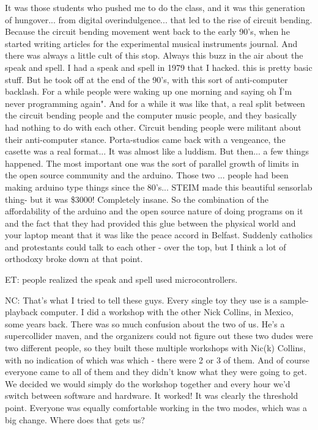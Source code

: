 It was those students who pushed me to do the class, and it was this generation of hungover... from digital overindulgence... that led to the rise of circuit bending. Because the circuit bending movement went back to the early 90's, when he started writing articles for the experimental musical instruments journal. And there was always a little cult of this stop. Always this buzz in the air about the speak and spell. I had a speak and spell in 1979 that I hacked. this is pretty basic stuff. But he took off at the end of the 90's, with this sort of anti-computer backlash. For a while people were waking up one morning and saying oh \"I'm never programming again". And for a while it was like that, a real split between the circuit bending people and the computer music people, and they basically had nothing to do with each other. Circuit bending people were militant about their anti-computer stance. Porta-studios came back with a vengeance, the casette was a real format... It was almost like a luddism. But then... a few things happened. The most important one was the sort of parallel growth of limits in the open source community and the arduino. Those two ... people had been making arduino type things since the 80's... STEIM made this beautiful sensorlab thing- but it was \$3000! Completely insane. So the combination of the affordability of the arduino and the open source nature of doing programs on it and the fact that they had provided this glue between the physical world and your laptop meant that it was like the peace accord in Belfast. Suddenly catholics and protestants could talk to each other - over the top, but I think a lot of orthodoxy broke down at that point. 

ET: people realized the speak and spell used microcontrollers. 

NC: That's what I tried to tell these guys. Every single toy they use is a sample-playback computer. I did a workshop with the other Nick Collins, in Mexico, some years back. There was so much confusion about the two of us. He's a supercollider maven, and the organizers could not figure out these two dudes were two different people, so they built these multiple workshops with Nic(k) Collins, with no indication of which was which - there were 2 or 3 of them. And of course everyone came to all of them and they didn't know what they were going to get. We decided we would simply do the workshop together and every hour we'd switch between software and hardware. It worked! It was clearly the threshold point. Everyone was equally comfortable working in the two modes, which was a big change. Where does that gets us?

